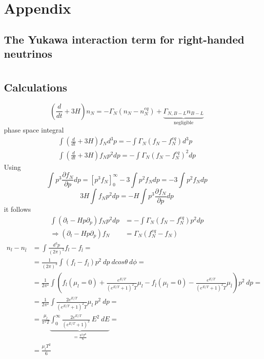 \appendix
\chapter{Appendix}
\section{The Yukawa interaction term for right-handed neutrinos}
\chapter{}
\section{Calculations}
\begin{equation*}
(\frac{d}{dt}+3H)n_N=-\Gamma_N(n_N-n_N^{eq})+\underbrace{\Gamma_{N,B-L}n_{B-L}}_\text{negligible}
\end{equation*}
phase space integral
\begin{align*}
\int (\frac{d}{dt}+3H)f_Nd^3p=-\int\Gamma_N(f_N-f_N^{eq})d^3p\\
\int (\frac{d}{dt}+3H)f_Np^2dp=-\int\Gamma_N(f_N-f_N^{eq})^2dp
\end{align*}
Using
\begin{equation*}
\int p^3\frac{\partial f_N}{\partial p}dp=\left[p^3f_N\right]_0^\infty-3\int p^2f_Ndp=-3\int p^2f_Ndp
\end{equation*}
\begin{equation*}
3H\int f_Np^2dp=-H\int p^3\frac{\partial f_N}{\partial p}dp
\end{equation*}
it follows
\begin{align*}
\int (\partial_t-Hp\partial_p)f_Np^2dp&=-\int\Gamma_N(f_N-f_N^{eq})p^2dp\\
\Rightarrow (\partial_t-Hp\partial_p)f_N&=\Gamma_N(f_N^{eq}-f_N)
\end{align*}
\newpage
\begin{align*}
	n_l-n_{\bar{l}}&=\int\frac{d^3p}{(2\pi)^3}f_l-f_{\bar{l}}=\\
	&=\frac{1}{(2\pi)^3}\int (f_l-f_{\bar{l}})p^2\:dp\:dcos\theta \:d\phi=\\
	&=\frac{1}{2\pi^2}\int\left(f_l(\mu_l=0)+\frac{e^{E/T}}{(e^{E/T}+1)^2T}\mu_l-f_{\bar{l}}(\mu_{\bar{l}}=0)-\frac{e^{E/T}}{(e^{E/T}+1)^2T}\mu_{\bar{l}}\right)p^2\:dp=\\
	&=\frac{1}{2\pi^2}\int\frac{2e^{E/T}}{(e^{E/T}+1)^2T}\mu_l\:p^2\:dp=\\
	&=\frac{\mu_l}{\pi^2T}\underbrace{\int_{0}^{\infty}\frac{2e^{E/T}}{(e^{E/T}+1)^2}\:E^2\:dE}_{=\frac{\pi^2T^3}{6}}=\\
	&=\frac{\mu_lT^2}{6}
\end{align*}
